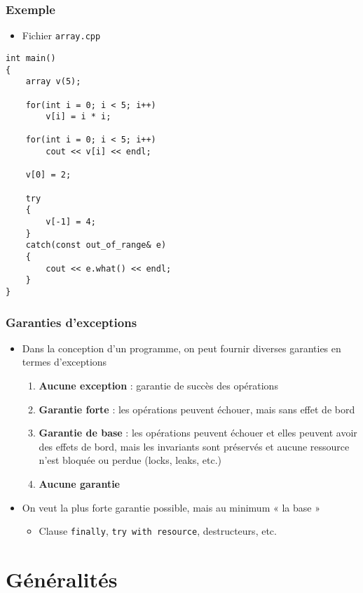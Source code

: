 \begin{frame}[containsverbatim]
\frametitle{Exemple}
\begin{itemize}
\item Fichier \texttt{array.cpp}
\end{itemize}
\begin{lstlisting}
int main()
{
	array v(5);

	for(int i = 0; i < 5; i++)
		v[i] = i * i;

	for(int i = 0; i < 5; i++)
		cout << v[i] << endl;

	v[0] = 2;
	
	try
	{
		v[-1] = 4;
	}
	catch(const out_of_range& e)
	{
		cout << e.what() << endl;
	}
}
\end{lstlisting}
\end{frame}

\begin{frame}
\frametitle{Garanties d'exceptions}
\begin{itemize}[<+->]
\item Dans la conception d'un programme, on peut fournir diverses garanties en termes d'exceptions
	\begin{enumerate}
	\item \textbf{Aucune exception} : garantie de succès des opérations
	\item \textbf{Garantie forte} : les opérations peuvent échouer, mais sans effet de bord
	\item \textbf{Garantie de base} : les opérations peuvent échouer et elles peuvent avoir des effets de bord, mais les invariants sont préservés et aucune ressource n'est bloquée ou perdue (locks, leaks, etc.)
	\item \textbf{Aucune garantie}
	\end{enumerate}
\item On veut la plus forte garantie possible, mais au minimum « la base »
	\begin{itemize}
	\item Clause \texttt{finally}, \texttt{try with resource}, destructeurs, etc.
	\end{itemize}
\end{itemize}
\end{frame}

\section{Généralités}

